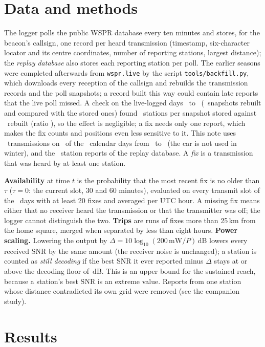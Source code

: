 \documentclass[10pt,a4paper]{article}
\begin{document}
\section{Data and methods}
\label{sec:meth}
The logger polls the public WSPR database every ten minutes and stores, for the beacon's callsign, one record per heard transmission (timestamp, six-character locator and its centre coordinates, number of reporting stations, largest distance); the \emph{replay database} also stores each reporting station per poll. The earlier seasons were completed afterwards from \texttt{wspr.live} by the script \texttt{tools/backfill.py}, which downloads every reception of the callsign and rebuilds the transmission records and the poll snapshots; a record built this way could contain late reports that the live poll missed. A check on the live-logged days \cmpFrom\ to \cmpTo\ (\cmpSnaps\ snapshots rebuilt and compared with the stored ones) found \cmpStored\ stations per snapshot stored against \cmpRebuilt\ rebuilt (ratio \cmpRatio), so the effect is negligible; a fix needs only one report, which makes the fix counts and positions even less sensitive to it. This note uses \wFixes\ transmissions on \wDaysWith\ of the \wSpan\ calendar days from \wFirst\ to \wLast\ (the car is not used in winter), and the \nRows\ station reports of the replay database. A \emph{fix} is a transmission that was heard by at least one station.

\textbf{Availability} at time $t$ is the probability that the most recent fix is no older than $\tau$ ($\tau=0$: the current slot, 30 and 60 minutes), evaluated on every transmit slot of the \wActiveDays\ days with at least 20 fixes and averaged per UTC hour. A missing fix means either that no receiver heard the transmission or that the transmitter was off; the logger cannot distinguish the two. \textbf{Trips} are runs of fixes more than 25\,km from the home square, merged when separated by less than eight hours. \textbf{Power scaling.} Lowering the output by $\Delta=10\log_{10}(200\,\text{mW}/P)$\,dB lowers every received SNR by the same amount (the receiver noise is unchanged); a station is counted as \emph{still decoding} if the best SNR it ever reported minus $\Delta$ stays at or above the decoding floor of \wFloor\,dB. This is an upper bound for the sustained reach, because a station's best SNR is an extreme value. Reports from one station whose distance contradicted its own grid were removed (see the companion study).

\section{Results}
\label{sec:res}
\end{document}
